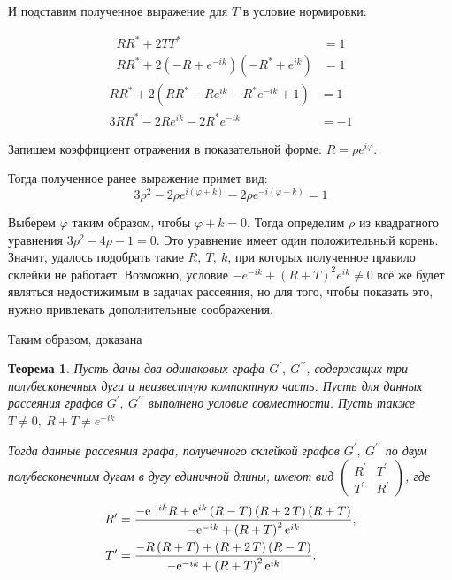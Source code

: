 \documentclass[a4 paper, 12 pt]{extarticle}
\newtheorem{theorem}{Теорема}[section]
\begin{document}
   И подставим полученное выражение для $T$ в условие нормировки:
   
   \[
   \begin{aligned}
   RR^* + 2TT^* &= 1\\
   RR^* + 2\left(-R + e^{-ik}\right)\left(-R^* + e^{ik}\right) &= 1
   \end{aligned}\]
   \[
   \begin{aligned}
   RR^* + 2\left(RR^* -Re^{ik} -R^*e^{-ik} + 1\right) &= 1\\
   3RR^* -2Re^{ik}-2R^*e^{-ik} &= -1
   \end{aligned}
   \]
   
   Запишем коэффициент отражения в показательной форме: $R = \rho e^{i \varphi}$.
   
   Тогда полученное ранее выражение примет вид:
   \[
   3 \rho^2 -2 \rho e^{i\left(\varphi+k\right)} -2 \rho e^{-i\left(\varphi+k\right)} = 1
   \]
   
   Выберем $\varphi$ таким образом, чтобы $\varphi + k = 0$. Тогда определим $\rho$ из квадратного уравнения $3\rho^2 -4\rho -1 = 0$.
   Это уравнение имеет один положительный корень. Значит, удалось подобрать такие $R, \ T, \ k$, при которых полученное правило склейки не работает. Возможно, условие $-e^{-ik} + \left(R+T\right)^2 e^{ik} \neq 0$ всё же будет являться недостижимым в задачах рассеяния, но для того, чтобы показать это, нужно привлекать дополнительные соображения.
   
   Таким образом, доказана
   
   \begin{theorem}
   	Пусть даны два одинаковых графа $G^\prime, \ G^{\prime\prime}$, содержащих три полубесконечных дуги и неизвестную компактную часть. Пусть для данных рассеяния графов  $G^\prime, \ G^{\prime\prime}$ выполнено условие совместности. Пусть также $T \neq 0, \ R+T \neq e^{-ik}$
   	
   	Тогда данные рассеяния графа, полученного склейкой графов $G^\prime, \ G^{\prime\prime}$ по двум полубесконечным дугам в дугу единичной длины, имеют вид $\left(\begin{matrix}
   	R^\prime & T^\prime \\
   	T^\prime & R^\prime
   	\end{matrix}\right)$, где
   	\[
   	\begin{aligned}
   	R^\prime &= {\frac {-{{\rm e}^{-ik}}R+{{\rm e}^{ik}} \left( R-T \right)  \left( R+
		2\,T \right)  \left( R+T \right) }{-{{\rm e}^{-ik}}+ \left(R+T\right)^2 {{\rm e}^{ik}}}}, \\
    T^\prime &= {\frac {-R \left( R+T \right)+\left( R+2\,T \right)  \left( R-T \right) }{-{{\rm e}^{-ik}}+
		\left(R+T\right)^2 {{\rm e}^{ik}}}}.
   	\end{aligned}\]
   \end{theorem}
\end{document}
